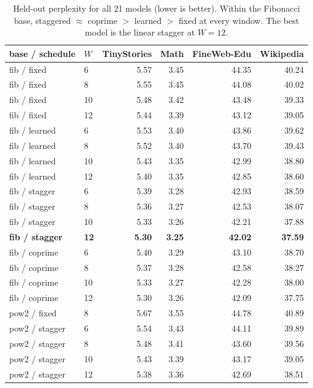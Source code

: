 \documentclass[11pt]{article}
\begin{document}
\begin{table}[htbp]
\centering
\small
\begin{tabular}{llrrrr}
\toprule
base / schedule & $W$ & TinyStories & Math & FineWeb-Edu & Wikipedia \\
\midrule
fib / fixed     & 6  & 5.57 & 3.45 & 44.35 & 40.24 \\
fib / fixed     & 8  & 5.55 & 3.45 & 44.08 & 40.02 \\
fib / fixed     & 10 & 5.48 & 3.42 & 43.48 & 39.33 \\
fib / fixed     & 12 & 5.44 & 3.39 & 43.12 & 39.05 \\
\addlinespace
fib / learned   & 6  & 5.53 & 3.40 & 43.86 & 39.62 \\
fib / learned   & 8  & 5.52 & 3.40 & 43.70 & 39.43 \\
fib / learned   & 10 & 5.43 & 3.35 & 42.99 & 38.80 \\
fib / learned   & 12 & 5.40 & 3.35 & 42.85 & 38.60 \\
\addlinespace
fib / stagger   & 6  & 5.39 & 3.28 & 42.93 & 38.59 \\
fib / stagger   & 8  & 5.36 & 3.27 & 42.53 & 38.07 \\
fib / stagger   & 10 & 5.33 & 3.26 & 42.21 & 37.88 \\
\textbf{fib / stagger} & \textbf{12} & \textbf{5.30} & \textbf{3.25} & \textbf{42.02} & \textbf{37.59} \\
\addlinespace
fib / coprime   & 6  & 5.40 & 3.29 & 43.10 & 38.70 \\
fib / coprime   & 8  & 5.37 & 3.28 & 42.58 & 38.27 \\
fib / coprime   & 10 & 5.33 & 3.27 & 42.28 & 38.00 \\
fib / coprime   & 12 & 5.30 & 3.26 & 42.09 & 37.75 \\
\addlinespace
pow2 / fixed    & 8  & 5.67 & 3.55 & 44.78 & 40.89 \\
pow2 / stagger  & 6  & 5.54 & 3.43 & 44.11 & 39.89 \\
pow2 / stagger  & 8  & 5.48 & 3.41 & 43.60 & 39.56 \\
pow2 / stagger  & 10 & 5.43 & 3.39 & 43.17 & 39.05 \\
pow2 / stagger  & 12 & 5.38 & 3.36 & 42.69 & 38.51 \\
\bottomrule
\end{tabular}
\caption{Held-out perplexity for all 21 models (lower is better). Within the
Fibonacci base, staggered $\approx$ coprime $>$ learned $>$ fixed at every
window. The best model is the linear stagger at $W{=}12$.}
\label{tab:matrix}
\end{table}
\end{document}
